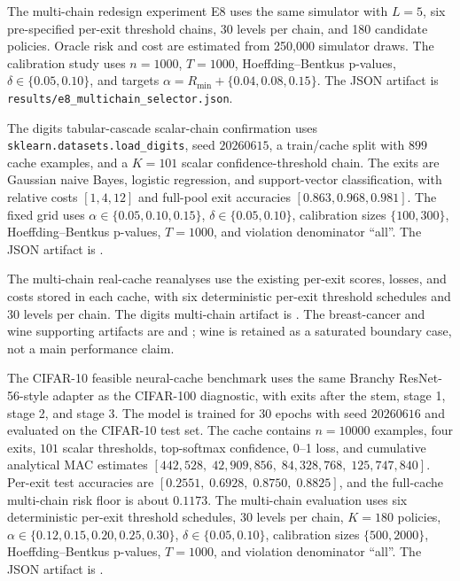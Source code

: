 \documentclass{ieeeaccess}
\begin{document}
The multi-chain redesign experiment E8 uses the same simulator with $L=5$, six pre-specified per-exit threshold chains, 30 levels per chain, and 180 candidate policies. Oracle risk and cost are estimated from 250,000 simulator draws. The calibration study uses $n=1000$, $T=1000$, Hoeffding--Bentkus p-values, $\delta\in\{0.05,0.10\}$, and targets $\alpha=R_{\min}+\{0.04,0.08,0.15\}$. The JSON artifact is \texttt{results/e8\_multichain\_selector.json}.

The digits tabular-cascade scalar-chain confirmation uses \texttt{sklearn.datasets.load\_digits}, seed $20260615$, a train/cache split with $899$ cache examples, and a $K=101$ scalar confidence-threshold chain. The exits are Gaussian naive Bayes, logistic regression, and support-vector classification, with relative costs $[1,4,12]$ and full-pool exit accuracies $[0.863,0.968,0.981]$. The fixed grid uses $\alpha\in\{0.05,0.10,0.15\}$, $\delta\in\{0.05,0.10\}$, calibration sizes $\{100,300\}$, Hoeffding--Bentkus p-values, $T=1000$, and violation denominator ``all''. The JSON artifact is .

The multi-chain real-cache reanalyses use the existing per-exit scores, losses, and costs stored in each cache, with six deterministic per-exit threshold schedules and 30 levels per chain. The digits multi-chain artifact is . The breast-cancer and wine supporting artifacts are  and ; wine is retained as a saturated boundary case, not a main performance claim.

The CIFAR-10 feasible neural-cache benchmark uses the same Branchy ResNet-56-style adapter as the CIFAR-100 diagnostic, with exits after the stem, stage 1, stage 2, and stage 3. The model is trained for 30 epochs with seed $20260616$ and evaluated on the CIFAR-10 test set. The cache contains $n=10000$ examples, four exits, $101$ scalar thresholds, top-softmax confidence, 0--1 loss, and cumulative analytical MAC estimates $[442{,}528,\;42{,}909{,}856,\;84{,}328{,}768,\;125{,}747{,}840]$. Per-exit test accuracies are $[0.2551,\;0.6928,\;0.8750,\;0.8825]$, and the full-cache multi-chain risk floor is about $0.1173$. The multi-chain evaluation uses six deterministic per-exit threshold schedules, 30 levels per chain, $K=180$ policies, $\alpha\in\{0.12,0.15,0.20,0.25,0.30\}$, $\delta\in\{0.05,0.10\}$, calibration sizes $\{500,2000\}$, Hoeffding--Bentkus p-values, $T=1000$, and violation denominator ``all''. The JSON artifact is .
\end{document}
